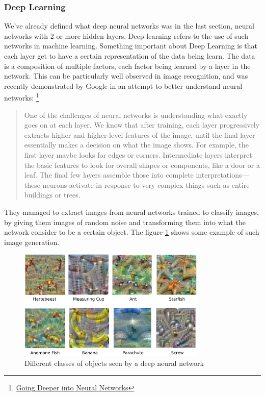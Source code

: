 \documentclass[12pt]{article}
\begin{document}
\subsubsection{Deep Learning}

We've already defined what deep neural networks was in the last section, neural
networks with 2 or more hidden layers. Deep learning refers to the use of such
networks in machine learning. Something important about Deep Learning is that
each layer get to have a certain representation of the data being learn. The
data is a composition of multiple factors, each factor being learned by a layer
in the  network. This can be particularly well observed in image recognition,
and was  recently demonstrated by Google in an attempt to better understand
neural networks:
\footnote{\href{http://googleresearch.blogspot.co.uk/2015/06/inceptionism-going-deeper-into-neural.html}
{Going Deeper into Neural Networks}}

\begin{quote}
  One of the challenges of neural networks is understanding what exactly goes on
  at each layer. We know that after training, each layer progressively extracts
  higher and higher-level features of the image, until the final layer
  essentially makes a decision on what the image shows. For example, the first
  layer maybe looks for edges or corners. Intermediate layers interpret the
  basic features to look for overall shapes or components, like a door or a
  leaf. The final few layers assemble those into complete interpretations—these
  neurons activate in response to very complex things such as entire buildings
  or trees.
\end{quote}

They managed to extract images from neural networks trained to classify images, by
giving them images of random noise and transforming them into what the network
consider to be a certain object. The figure \ref{fig:classvis} shows some example of
such image generation.

\begin{figure}[ht]
    \centering
    \includegraphics[width=0.8\textwidth]{classvis}
    \caption{Different classes of objects seen by a deep neural network}
    \label{fig:classvis}
\end{figure}
\end{document}
